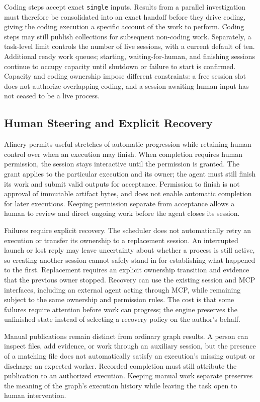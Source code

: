 \documentclass[letterpaper]{article}
\theoremstyle{definition}
\begin{document}
Coding steps accept exact \texttt{single} inputs. Results from a parallel
investigation must therefore be consolidated into an exact handoff before
they drive coding, giving the coding execution a specific account of the
work to perform. Coding steps may still publish collections for subsequent
non-coding work. Separately, a task-level limit controls the number of live
sessions, with a current default of ten. Additional ready work queues;
starting, waiting-for-human, and finishing sessions continue to occupy
capacity until shutdown or failure to start is confirmed. Capacity and
coding ownership impose different constraints: a free session slot does
not authorize overlapping coding, and a session awaiting human input has
not ceased to be a live process.

\subsection{Human Steering and Explicit Recovery}

Alinery permits useful stretches of automatic progression while retaining
human control over when an execution may finish. When completion requires
human permission, the session stays interactive until the permission is
granted. The grant applies to the particular execution and its owner; the
agent must still finish its work and submit valid outputs for acceptance.
Permission to finish is not approval of immutable artifact bytes, and does
not enable automatic completion for later executions. Keeping permission
separate from acceptance allows a human to review and direct ongoing work
before the agent closes its session.

Failures require explicit recovery. The scheduler does not automatically
retry an execution or transfer its ownership to a replacement session.
An interrupted launch or lost reply may leave uncertainty about whether a
process is still active, so creating another session cannot safely stand in
for establishing what happened to the first. Replacement requires an
explicit ownership transition and evidence that the previous owner stopped.
Recovery can use the existing session and MCP interfaces, including an
external agent acting through MCP, while remaining subject to the same
ownership and permission rules. The cost is that some failures require
attention before work can progress; the engine preserves the unfinished
state instead of selecting a recovery policy on the author's behalf.

Manual publications remain distinct from ordinary graph results. A person
can inspect files, add evidence, or work through an auxiliary session, but
the presence of a matching file does not automatically satisfy an execution's
missing output or discharge an expected worker. Recorded completion must
still attribute the publication to an authorized execution. Keeping manual
work separate preserves the meaning of the graph's execution history while
leaving the task open to human intervention.
\end{document}
